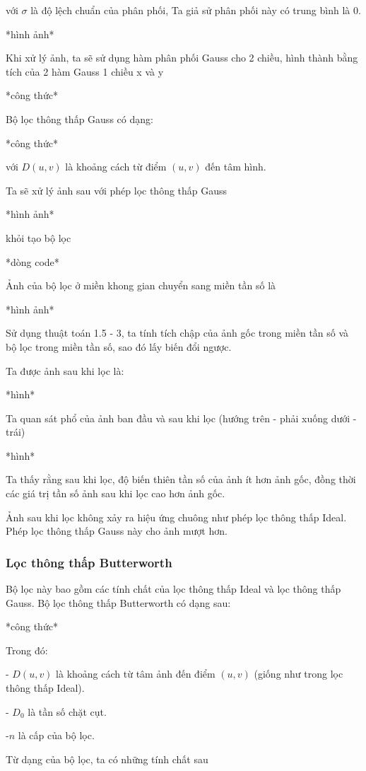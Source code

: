 \documentclass[12pt,a4paper]{report}
\numberwithin{equation}{section}
\theoremstyle{definition} %
\begin{document}
với $\sigma$ là độ lệch chuẩn của phân phối, Ta giả sử phân phối này có trung bình là 0.

*hình ảnh*

Khi xử lý ảnh, ta sẽ sử dụng hàm phân phối Gauss cho 2 chiều, hình thành bằng tích của 2 hàm Gauss 1 chiều x và y 

*công thức*

Bộ lọc thông thấp Gauss có dạng:

*công thức*

với $D(u,v)$ là khoảng cách từ điểm $(u,v)$ đến tâm hình.

Ta sẽ xử lý ảnh sau với phép lọc thông thấp Gauss

*hình ảnh*

khỏi tạo bộ lọc

*dòng code*

Ảnh của bộ lọc ở miền khong gian chuyển sang miền tần số là 

*hình ảnh*

Sử dụng thuật toán 1.5 - 3, ta tính tích chập của ảnh gốc trong miền tần số và bộ lọc trong miền tần số, sao đó lấy biến đổi ngược.

Ta được ảnh sau khi lọc là:

*hình*

Ta quan sát phổ của ảnh ban đầu và sau khi lọc (hướng trên - phải xuống dưới - trái)

*hình*

Ta thấy rằng sau khi lọc, độ biến thiên tần số của ảnh ít hơn ảnh gốc, đồng thời các giá trị tần số ảnh sau khi lọc cao hơn ảnh gốc.

Ảnh sau khi lọc không xảy ra hiệu ứng chuông như phép lọc thông thấp Ideal. Phép lọc thông thấp Gauss này cho ảnh mượt hơn.
\subsubsection{Lọc thông thấp Butterworth}

Bộ lọc này bao gồm các tính chất của lọc thông thấp Ideal và lọc thông thấp Gauss. Bộ lọc thông thấp Butterworth có dạng sau:

*công thức*


Trong đó:

- $D(u,v)$ là khoảng cách từ tâm ảnh đến điểm $(u,v)$ (giống như trong lọc thông thấp Ideal).

- $D_0$ là tần số chặt cụt.

-$n$ là cấp của bộ lọc.

Từ dạng của bộ lọc, ta có những tính chất sau
\end{document}
